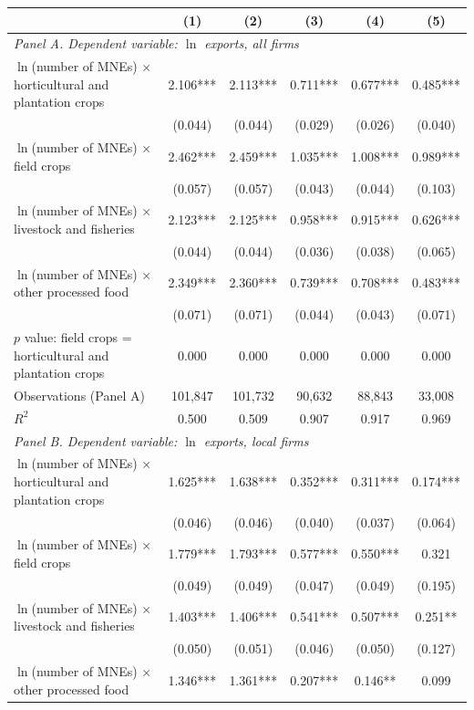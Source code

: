 \begin{tabular}{l*{5}{c}}
\toprule
 & (1) & (2) & (3) & (4) & (5) \\
\midrule
\multicolumn{6}{l}{\textit{Panel A. Dependent variable: $\ln$ exports, all firms}} \\
$\ln$(number of MNEs) $\times$ horticultural and plantation crops & 2.106*** & 2.113*** & 0.711*** & 0.677*** & 0.485*** \\
 & (0.044) & (0.044) & (0.029) & (0.026) & (0.040) \\
$\ln$(number of MNEs) $\times$ field crops & 2.462*** & 2.459*** & 1.035*** & 1.008*** & 0.989*** \\
 & (0.057) & (0.057) & (0.043) & (0.044) & (0.103) \\
$\ln$(number of MNEs) $\times$ livestock and fisheries & 2.123*** & 2.125*** & 0.958*** & 0.915*** & 0.626*** \\
 & (0.044) & (0.044) & (0.036) & (0.038) & (0.065) \\
$\ln$(number of MNEs) $\times$ other processed food & 2.349*** & 2.360*** & 0.739*** & 0.708*** & 0.483*** \\
 & (0.071) & (0.071) & (0.044) & (0.043) & (0.071) \\
$p$ value: field crops = horticultural and plantation crops & 0.000 & 0.000 & 0.000 & 0.000 & 0.000 \\
Observations (Panel A) & 101,847 & 101,732 & 90,632 & 88,843 & 33,008 \\
$R^2$ & 0.500 & 0.509 & 0.907 & 0.917 & 0.969 \\
\midrule
\multicolumn{6}{l}{\textit{Panel B. Dependent variable: $\ln$ exports, local firms}} \\
$\ln$(number of MNEs) $\times$ horticultural and plantation crops & 1.625*** & 1.638*** & 0.352*** & 0.311*** & 0.174*** \\
 & (0.046) & (0.046) & (0.040) & (0.037) & (0.064) \\
$\ln$(number of MNEs) $\times$ field crops & 1.779*** & 1.793*** & 0.577*** & 0.550*** & 0.321 \\
 & (0.049) & (0.049) & (0.047) & (0.049) & (0.195) \\
$\ln$(number of MNEs) $\times$ livestock and fisheries & 1.403*** & 1.406*** & 0.541*** & 0.507*** & 0.251** \\
 & (0.050) & (0.051) & (0.046) & (0.050) & (0.127) \\
$\ln$(number of MNEs) $\times$ other processed food & 1.346*** & 1.361*** & 0.207*** & 0.146** & 0.099 \\

\end{tabular}
